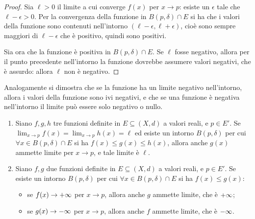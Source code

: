 \begin{proof}
Sia $\ell>0$ il limite a cui converge $f(x)$ per $x\to p$: esiste un $\epsilon$ tale che $\ell-\epsilon>0$. Per la convergenza della funzione in $B(p,\delta)\cap E$ si ha che i valori della funzione sono contenuti nell'intorno $(\ell-\epsilon,\ell+\epsilon)$, cioè sono sempre maggiori di $\ell-\epsilon$ che è positivo, quindi sono positivi.

Sia ora che la funzione è positiva in $B(p,\delta)\cap E$. Se $\ell$ fosse negativo, allora per il punto precedente nell'intorno la funzione dovrebbe assumere valori negativi, che è assurdo: allora $\ell$ non è negativo.
\end{proof}
Analogamente si dimostra che se la funzione ha un limite negativo nell'intorno, allora i valori della funzione sono ivi negativi, e che se una funzione è negativa nell'intorno il limite può essere solo negativo o nullo.
\begin{teorema}
\begin{enumerate}
\item Siano $f,g,h$ tre funzioni definite in $E\subseteq(X,d)$ a valori reali, e $p\in E'$. Se $\lim_{x\to p}f(x)=\lim_{x\to p}h(x)=\ell$ ed esiste un intorno $B(p,\delta)$ per cui $\forall x\in B(p,\delta)\cap E$ si ha $f(x)\leq g(x)\leq h(x)$, allora anche $g(x)$ ammette limite per $x\to p$, e tale limite è $\ell$.
\item Siano $f,g$ due funzioni definite in $E\subseteq(X,d)$ a valori reali, e $p\in E'$. Se esiste un intorno $B(p,\delta)$ per cui $\forall x\in B(p,\delta)\cap E$ si ha $f(x)\leq g(x)$:
\begin{itemize}
\item se $f(x)\to+\infty$ per $x\to p$, allora anche $g$ ammette limite, che è $+\infty$;
\item se $g(x)\to-\infty$ per $x\to p$, allora anche $f$ ammette limite, che è $-\infty$. 
\end{itemize}
\end{enumerate}
\end{teorema}

